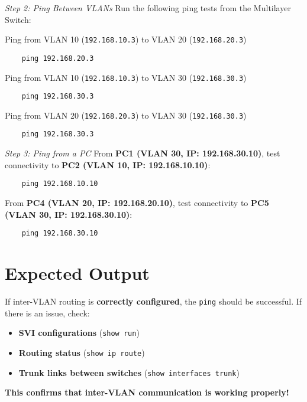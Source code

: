 \documentclass[a4paper]{book}
\begin{document}
\begin{enumerate}
    \textit{Step 2: Ping Between VLANs}
    \newline
    \newline
    Run the following ping tests from the Multilayer Switch:
    
    Ping from VLAN 10 (\texttt{192.168.10.3}) to VLAN 20 (\texttt{192.168.20.3})
    \begin{lstlisting}
    ping 192.168.20.3
    \end{lstlisting}
    
    Ping from VLAN 10 (\texttt{192.168.10.3}) to VLAN 30 (\texttt{192.168.30.3})
    \begin{lstlisting}
    ping 192.168.30.3
    \end{lstlisting}
    
    Ping from VLAN 20 (\texttt{192.168.20.3}) to VLAN 30 (\texttt{192.168.30.3})
    \begin{lstlisting}
    ping 192.168.30.3
    \end{lstlisting}
    
    \textit{Step 3: Ping from a PC}
    \newline
    \newline
    From \textbf{PC1 (VLAN 30, IP: 192.168.30.10)}, test connectivity to \textbf{PC2 (VLAN 10, IP: 192.168.10.10)}:
    \begin{lstlisting}
    ping 192.168.10.10
    \end{lstlisting}
    
    From \textbf{PC4 (VLAN 20, IP: 192.168.20.10)}, test connectivity to \textbf{PC5 (VLAN 30, IP: 192.168.30.10)}:
    \begin{lstlisting}
    ping 192.168.30.10
    \end{lstlisting}
    
    \section*{Expected Output}
    If inter-VLAN routing is \textbf{correctly configured}, the \texttt{ping} should be successful. If there is an issue, check:
    \begin{itemize}
        \item \textbf{SVI configurations} (\texttt{show run})
        \item \textbf{Routing status} (\texttt{show ip route})
        \item \textbf{Trunk links between switches} (\texttt{show interfaces trunk})
    \end{itemize}
    
    \textbf{\checkmark This confirms that inter-VLAN communication is working properly!}
    


\end{enumerate}
\end{document}
